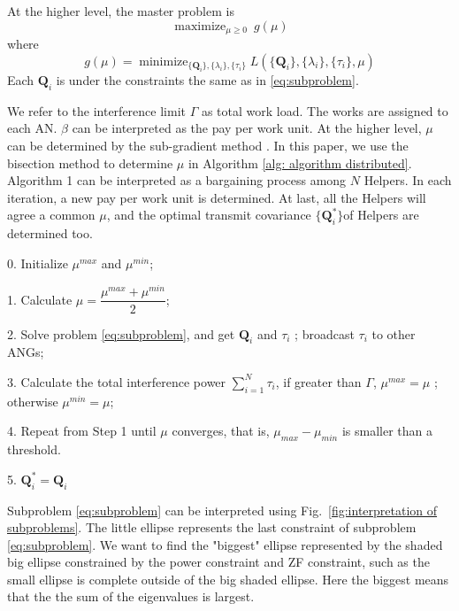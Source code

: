 \documentclass[conference]{IEEEtran}
\begin{document}
At the higher level, the master problem is
\begin{equation}\label{eq:master problem}
\mathop{\text{maximize}}_{\mu\geq 0} ~g(\mu)
\end{equation}
where
\begin{equation}
g(\mu)= \mathop{\text{minimize}}_{\{\mathbf{Q}_{i}\}, \{\lambda_i\},\{\tau_i\}}L(\{\mathbf{Q}_{i}\}, \{\lambda_i\},\{\tau_i\},\mu)
\end{equation}
Each $\mathbf{Q}_i$ is under the constraints the same as in \eqref{eq:subproblem}. 

We refer to the interference limit $\Gamma$ as total work load. The works are assigned to each AN. $\beta$ can be interpreted as the pay per work unit.  At the higher level,  $\mu$ can be determined by the sub-gradient method \cite{palomar2006tutorial}. In this paper, we use the bisection method to determine $\mu$ in Algorithm \ref{alg: algorithm distributed}. Algorithm 1 can be interpreted as a bargaining process among $N$ Helpers. In each iteration, a new pay per work unit is determined. At last, all the Helpers will agree a common $\mu$, and the optimal transmit covariance $\{\mathbf{Q}_i^*\}$of Helpers are determined too.

\begin{algorithm}
	\caption{}\label{alg: algorithm distributed}
	\begin{algorithmic}
		\item[0.] Initialize $\mu^{max}$ and $\mu^{min}$;
		\item[1.] Calculate $\mu = \dfrac{\mu^{max}+\mu^{min}}{2}$;
		\item[2.] Solve problem \eqref{eq:subproblem}, and get $\mathbf{Q}_i$ and $\tau_i$ ; broadcast $\tau_i$ to other ANGs;
		\item[3.] Calculate the total interference power $\sum_{i =1}^{N}\tau_i$, if greater than $\Gamma$, $\mu^{max} = \mu$ ; otherwise $\mu^{min} = \mu$;
		\item[4.] Repeat from Step 1 until $\mu$ converges, that is, $\mu_{max} -\mu_{min}$ is smaller than a threshold.
		\item[5.] $\mathbf{Q}_i^* = \mathbf{Q}_i$
	\end{algorithmic}
\end{algorithm}

Subproblem \eqref{eq:subproblem} can be interpreted using Fig.~\ref{fig:interpretation of subproblems}. The little ellipse represents the last constraint of subproblem \eqref{eq:subproblem}. We want to find the "biggest" ellipse represented by the shaded big ellipse constrained by the power constraint and ZF constraint, such as the small ellipse is complete outside of the big shaded ellipse. Here the biggest means that the the sum of the eigenvalues is largest.
\end{document}
